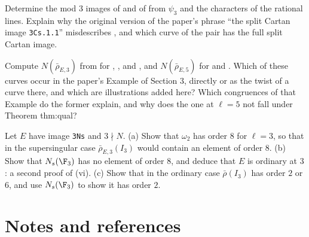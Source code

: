 \begin{exercise}\label{ex:galrep:3cs11}
Determine the mod $3$ images of  and of  from $\psi_3$ and the characters of the rational lines. Explain why the original version of
the paper's phrase ``the split Cartan image \texttt{3Cs.1.1}'' misdescribes , and which curve of the pair has the full split Cartan image.
\end{exercise}

\begin{exercise}\label{ex:galrep:conductors}
Compute $N(\bar\rho_{E,3})$ from  for , ,  and , and $N(\bar\rho_{E,5})$ for  and
. Which of these curves occur in the paper's Example of Section 3, directly or as the twist of a curve there, and which are illustrations
added here? Which congruences of that Example do the former explain, and why does the one at $\ell=5$ not fall under Theorem thm:qual?
\end{exercise}

\begin{exercise}\label{ex:galrep:ns-ordinary}
Let $E$ have image \texttt{3Ns} and $3\nmid N$. (a) Show that $\omega_2$ has order $8$ for $\ell=3$, so that in the supersingular case $\bar\rho_{E,3}(I_3)$ would contain an
element of order $8$. (b) Show that $N_s(\F_3)$ has no element of order $8$, and deduce that $E$ is ordinary at $3$: a second proof of
(vi). (c) Show that in the ordinary case $\bar\rho(I_3)$ has order $2$ or $6$, and use $N_s(\F_3)$ to show it has order $2$.
\end{exercise}

\section{Notes and references}\label{sec:galrep:notes}

